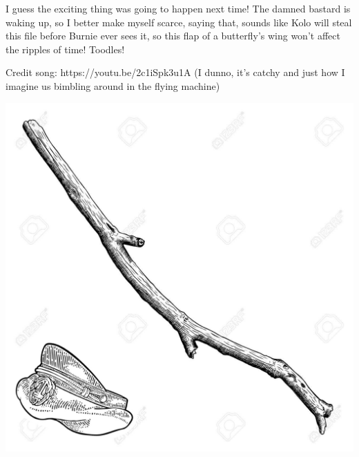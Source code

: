 \begin{multicols}{2}
I guess the exciting thing was going to happen next time! The damned bastard is waking up, so I better make myself scarce, saying that, sounds like Kolo will steal this file before Burnie ever sees it, so this flap of a butterfly’s wing won’t affect the ripples of time! Toodles!\medskip

Credit song: https://youtu.be/2c1iSpk3u1A (I dunno, it's catchy and just how I imagine us bimbling around in the flying machine)\medskip


\end{multicols}

\vspace*{5mm}

\begin{center}
\includegraphics[width=\textwidth]{./content/img/xxx.jpg}
\begin{figure}[h]
\end{figure}
\end{center}

\clearpage